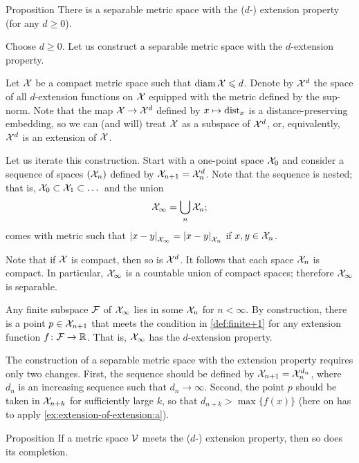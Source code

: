\begin{thm}{Proposition}\label{prop:univeral-separable}
There is a separable metric space with the ($d$-) extension property (for any $d\ge 0$).
\end{thm}

Choose $d\ge 0$.
Let us construct a separable metric space with  the $d$-extension property.

Let $\mathcal{X}$ be a compact metric space such that $\operatorname{\rm diam}\nolimits\mathcal{X}\leqslant d$.
Denote by $\mathcal{X}^d$ the space of all $d$-extension functions on $\mathcal{X}$ equipped with the metric defined by the sup-norm.
Note that the map $\mathcal{X} \to \mathcal{X}^d$ defined by $x\mapsto\mathrm{dist}_x$ is a distance-preserving embedding,
so we can (and will) treat $\mathcal{X}$ as a subspace of $\mathcal{X}^d$, or, equivalently, $\mathcal{X}^d$ is an extension of $\mathcal{X}$.

Let us iterate this construction.
Start with a one-point space $\mathcal{X}_0$ and consider a sequence of spaces $(\mathcal{X}_n)$ defined by $\spc{X}_{n+1}\z=\spc{X}_n^d$.
Note that the sequence is nested;
that is, $\mathcal{X}_0\subset \mathcal{X}_1\subset\dots$
and the union
\[\mathcal{X}_\infty=\bigcup_n\mathcal{X}_n;\]
comes with metric such that
$\dist{x}{y}{\spc{X}_\infty} = \dist{x}{y}{\spc{X}_n}$
if $x,y\in\mathcal{X}_n$.

Note that if $\mathcal{X}$ is compact, then so is $\mathcal{X}^d$.
It follows that each space $\mathcal{X}_n$ is compact.
In particular, $\mathcal{X}_\infty$ is a countable union of compact spaces;
therefore $\mathcal{X}_\infty$ is separable.

Any finite subspace $\mathcal{F}$ of $\mathcal{X}_\infty$ lies in some $\mathcal{X}_n$ for $n<\infty$.
By construction, there is a point $p\in \mathcal{X}_{n+1}$ that meets the condition in \ref{def:finite+1} for any extension function $f\colon\mathcal{F}\to\mathbb{R}$.
That is, $\mathcal{X}_\infty$ has the $d$-extension property.

The construction of a separable metric space with the extension property requires only two changes.
First, the sequence should be defined by $\spc{X}_{n+1}\z=\spc{X}_n^{d_n}$, where $d_n$ is an increasing sequence such that $d_n\to\infty$.
Second, the point $p$ should be taken in $\mathcal{X}_{n+k}$ for sufficiently large $k$, so that $d_{n+k}>\max\{f(x)\}$
(here on has to apply \ref{ex:extension-of-extension:a}).
\qeds

\begin{thm}{Proposition}\label{prop:completion-univeral}
If a metric space $\mathcal{V}$ meets the ($d$-) extension property, then so does its completion.
\end{thm}

